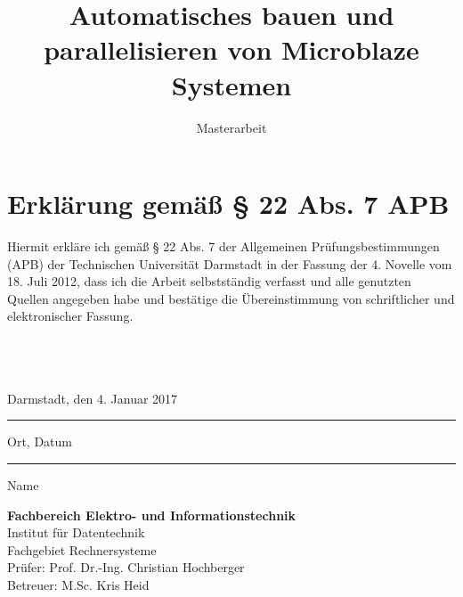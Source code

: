 \documentclass[accentcolor=tud1c,colorback,ngerman,12pt] {tudreport}
\begin{document}
\title{Automatisches bauen und parallelisieren von Microblaze Systemen}
\subtitle{Masterarbeit}

\maketitle
\chapter*{Erklärung gemäß § 22 Abs. 7 APB}

Hiermit erkläre ich gemäß § 22 Abs. 7 der Allgemeinen Prüfungsbestimmungen (APB) der Technischen Universität Darmstadt in der Fassung der 4. Novelle vom 18. Juli 2012, dass ich die Arbeit selbstständig verfasst und alle genutzten Quellen angegeben habe und bestätige die Übereinstimmung von schriftlicher und elektronischer Fassung.\\ \\ \\ \\

\parbox{8cm}{\centering Darmstadt, den 4. Januar 2017\hrule
\strut \centering\footnotesize Ort, Datum} \hfill\parbox{8cm}{\phantom{Darmstadt, den 4. Januar 2017} \hrule
\strut \centering\footnotesize Name}

\vfill

\noindent \textbf{Fachbereich Elektro- und Informationstechnik}\\
Institut für Datentechnik\\
Fachgebiet Rechnersysteme\\
Prüfer: Prof. Dr.-Ing. Christian Hochberger\\
Betreuer: M.Sc. Kris Heid

\tableofcontents







\end{document}
